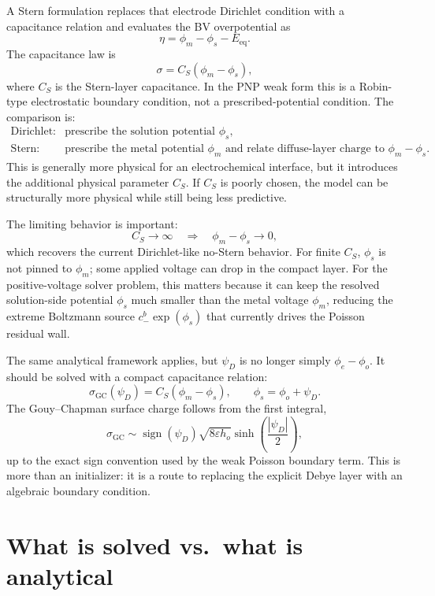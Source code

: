 \documentclass[11pt]{article}
\newcommand{\Eeq}{E_{\mathrm{eq}}}
\newcommand{\epshat}{\varepsilon}
\begin{document}
A Stern formulation replaces that electrode Dirichlet condition with a
capacitance relation and evaluates the BV overpotential as
\[
  \eta = \phi_m-\phi_s-\Eeq.
\]
The capacitance law is
\[
  \sigma = C_S(\phi_m-\phi_s),
\]
where \(C_S\) is the Stern-layer capacitance. In the PNP weak form this is a
Robin-type electrostatic boundary condition, not a prescribed-potential
condition. The comparison is:
\[
\begin{array}{ll}
\text{Dirichlet:} & \text{prescribe the solution potential } \phi_s, \\
\text{Stern:}     & \text{prescribe the metal potential } \phi_m
                    \text{ and relate diffuse-layer charge to }
                    \phi_m-\phi_s.
\end{array}
\]
This is generally more physical for an electrochemical interface, but it
introduces the additional physical parameter \(C_S\). If \(C_S\) is poorly
chosen, the model can be structurally more physical while still being less
predictive.

The limiting behavior is important:
\[
  C_S\rightarrow\infty
  \quad\Longrightarrow\quad
  \phi_m-\phi_s\rightarrow 0,
\]
which recovers the current Dirichlet-like no-Stern behavior. For finite
\(C_S\), \(\phi_s\) is not pinned to \(\phi_m\); some applied voltage can drop
in the compact layer. For the positive-voltage solver problem, this matters
because it can keep the resolved solution-side potential \(\phi_s\) much
smaller than the metal voltage \(\phi_m\), reducing the extreme Boltzmann
source \(c_-^b\exp(\phi_s)\) that currently drives the Poisson residual wall.

The same analytical framework applies, but \(\psi_D\) is no longer simply
\(\phi_e-\phi_o\). It should be solved with a compact capacitance relation:
\[
  \sigma_{\mathrm{GC}}(\psi_D)
  =
  C_S(\phi_m-\phi_s),
  \qquad
  \phi_s=\phi_o+\psi_D.
\]
The Gouy--Chapman surface charge follows from the first integral,
\[
  \sigma_{\mathrm{GC}}
  \sim
  \operatorname{sign}(\psi_D)\sqrt{8\epshat h_o}
  \sinh\!\left(\frac{|\psi_D|}{2}\right),
\]
up to the exact sign convention used by the weak Poisson boundary term. This
is more than an initializer: it is a route to replacing the explicit Debye
layer with an algebraic boundary condition.

\section{What is solved vs.\ what is analytical}
\end{document}
